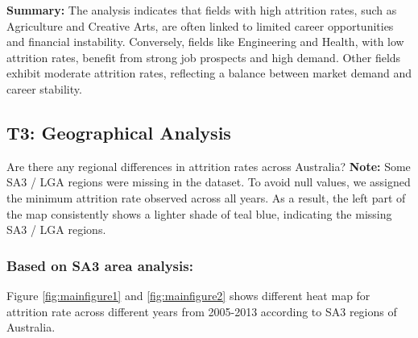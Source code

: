 \documentclass[conference]{IEEEtran}
\begin{document}
\textbf{Summary:} The analysis indicates that fields with high attrition rates, such as Agriculture and Creative Arts, are often linked to limited career opportunities and financial instability. Conversely, fields like Engineering and Health, with low attrition rates, benefit from strong job prospects and high demand. Other fields exhibit moderate attrition rates, reflecting a balance between market demand and career stability.

\subsection{T3: Geographical Analysis}
 Are there any regional differences in attrition rates across Australia?
\indent \textbf{Note:} Some SA3 / LGA regions were missing in the dataset. To avoid null values, we assigned the minimum attrition rate observed across all years. As a result, the left part of the map consistently shows a lighter shade of teal blue, indicating the missing SA3 / LGA regions.
\subsubsection{Based on SA3 area analysis:}
Figure \ref{fig:mainfigure1} and \ref{fig:mainfigure2} shows different heat map for attrition rate across different years from 2005-2013 according to SA3 regions of Australia.
\end{document}
